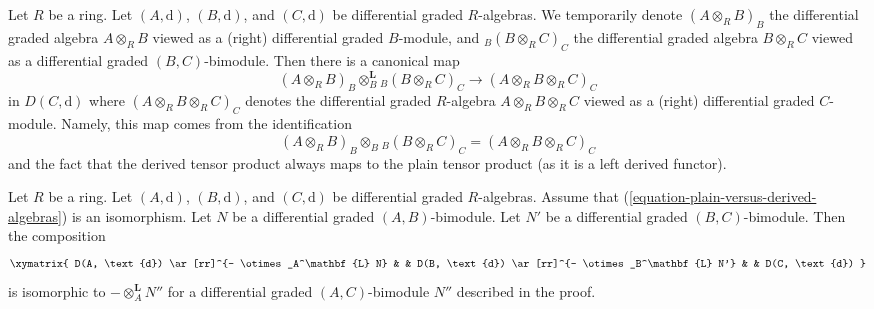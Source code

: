 \noindent
Let $R$ be a ring. Let $(A, \text{d})$, $(B, \text{d})$, and
$(C, \text{d})$ be differential graded $R$-algebras.
We temporarily denote $(A \otimes_R B)_B$ the differential
graded algebra $A \otimes_R B$ viewed as a (right) differential
graded $B$-module, and ${}_B(B \otimes_R C)_C$ the differential
graded algebra $B \otimes_R C$ viewed as a differential graded
$(B, C)$-bimodule. Then there is a canonical map
\begin{equation}
\label{equation-plain-versus-derived-algebras}
(A \otimes_R B)_B \otimes_B^\mathbf{L} {}_B(B \otimes_R C)_C
\longrightarrow
(A \otimes_R B \otimes_R C)_C
\end{equation}
in $D(C, \text{d})$ where $(A \otimes_R B \otimes_R C)_C$
denotes the differential
graded $R$-algebra $A \otimes_R B \otimes_R C$ viewed as a
(right) differential graded $C$-module. Namely, this map
comes from the identification
$$
(A \otimes_R B)_B \otimes_B {}_B(B \otimes_R C)_C =
(A \otimes_R B \otimes_R C)_C
$$
and the fact that the derived tensor product always maps to the
plain tensor product (as it is a left derived functor).

\begin{lemma}
\label{lemma-compose-tensor-functors-general-algebra}
Let $R$ be a ring. Let $(A, \text{d})$, $(B, \text{d})$, and
$(C, \text{d})$ be differential graded $R$-algebras. Assume
that (\ref{equation-plain-versus-derived-algebras}) is an isomorphism.
Let $N$ be a differential graded $(A, B)$-bimodule.
Let $N'$ be a differential graded $(B, C)$-bimodule.
Then the composition
$$
\xymatrix{
D(A, \text{d}) \ar[rr]^{- \otimes_A^\mathbf{L} N} & &
D(B, \text{d}) \ar[rr]^{- \otimes_B^\mathbf{L} N'} & &
D(C, \text{d})
}
$$
is isomorphic to $- \otimes_A^\mathbf{L} N''$ for a differential graded
$(A, C)$-bimodule $N''$ described in the proof.
\end{lemma}

